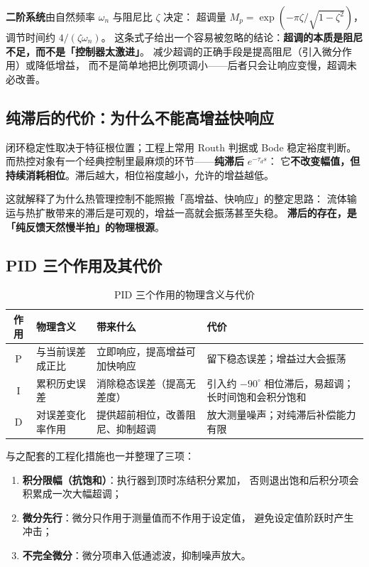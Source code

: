 \documentclass[stage1,fontset=fandol]{ydzjreport}
\begin{document}
	\textbf{二阶系统}由自然频率 $\omega_n$ 与阻尼比 $\zeta$ 决定：
	超调量 $M_p = \exp\!\left(-\pi\zeta/\sqrt{1-\zeta^2}\right)$，
	调节时间约 $4/(\zeta\omega_n)$。
	这条式子给出一个容易被忽略的结论：\textbf{超调的本质是阻尼不足，而不是「控制器太激进」}。
	减少超调的正确手段是提高阻尼（引入微分作用）或降低增益，
	而不是简单地把比例项调小——后者只会让响应变慢，超调未必改善。
	
	\subsection{纯滞后的代价：为什么不能高增益快响应}
	
	闭环稳定性取决于特征根位置；工程上常用 Routh 判据或 Bode 稳定裕度判断。
	而热控对象有一个经典控制里最麻烦的环节——\textbf{纯滞后} $e^{-\tau_d s}$：
	它\textbf{不改变幅值，但持续消耗相位}。滞后越大，相位裕度越小，允许的增益越低。
	
	这就解释了为什么热管理控制不能照搬「高增益、快响应」的整定思路：
	流体输运与热扩散带来的滞后是可观的，增益一高就会振荡甚至失稳。
	\textbf{滞后的存在，是「纯反馈天然慢半拍」的物理根源}。
	
	\subsection{PID 三个作用及其代价}
	
	\begin{table}[H]
		\centering
		\caption{PID 三个作用的物理含义与代价}
		\label{tab:pid}
		\begin{tabularx}{\textwidth}{@{}c Y Y Y@{}}
			\toprule
			 作用 & 物理含义 & 带来什么 & 代价 \\
			\midrule
			P & 与当前误差成正比 & 立即响应，提高增益可加快响应 & 留下稳态误差；增益过大会振荡 \\
			I & 累积历史误差 & 消除稳态误差（提高无差度） & 引入约 $-90^\circ$ 相位滞后，易超调；长时间饱和会积分饱和 \\
			D & 对误差变化率作用 & 提供超前相位，改善阻尼、抑制超调 & 放大测量噪声；对纯滞后补偿能力有限 \\
			\bottomrule
		\end{tabularx}
	\end{table}
	
	与之配套的工程化措施也一并整理了三项：
	\begin{enumerate}
		\item \textbf{积分限幅（抗饱和）}：执行器到顶时冻结积分累加，
		否则退出饱和后积分项会积累成一次大幅超调；
		\item \textbf{微分先行}：微分只作用于测量值而不作用于设定值，
		避免设定值阶跃时产生冲击；
		\item \textbf{不完全微分}：微分项串入低通滤波，抑制噪声放大。
	\end{enumerate}
	
\end{document}
